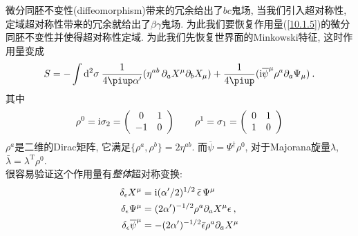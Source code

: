 微分同胚不变性(diffeomorphism)带来的冗余给出了$bc$鬼场, 当我们引入超对称性, 定域超对称性带来的冗余就给出了$\beta\gamma$鬼场. 为此我们要恢复作用量(\ref{10.1.5})的微分同胚不变性并使得超对称性定域.
为此我们先恢复世界面的Minkowski特征, 这时作用量变成
\begin{equation*}
    S=-\int\dif^{2}\sigma\:\frac{1}{4\uppi\alpha^{\prime}}(
    \eta^{ab}\,\partial_{a}X^{\mu}\partial_{b}X_{\mu})
    +\frac{1}{4\uppi}(\mi\overline{\psi}^{\mu}\rho^{a}\partial_{a}\Psi_{\mu})\:.
\end{equation*}
其中
\begin{equation*}
    \rho^{0}=\mathrm{i}\sigma_{2}=
    \left(\begin{array}{cc}
         0&1  \\
         -1&0 
    \end{array}\right) \qquad
    \rho^{1}=\sigma_{1}=
    \left(\begin{array}{cc}
         0&1  \\
         1&0 
    \end{array}\right)
\end{equation*}
$\rho^{a}$是二维的Dirac矩阵, 它满足$\{\rho^{a},\rho^{b}\}=2\eta^{ab}$. 而$\overline{\psi}=\Psi^{\dag}\rho^{0}$, 对于Majorana旋量$\lambda$, $\bar{\lambda}=\lambda^{\mathrm{T}}\rho^{0}$.
\\
很容易验证这个作用量有{\emph{整体}}超对称变换:
\begin{align*}
    \delta_{\epsilon}X^{\mu}&=\mathrm{i}(\alpha^{\prime}/2)^{1/2}\,\bar{\epsilon}\,\Psi^{\mu} \\
    \delta_{\epsilon}\Psi^{\mu}&=(2\alpha^{\prime})^{-1/2}\rho^{a}\partial_{a}X^{\mu}\epsilon\:, \\
    \delta _{\epsilon }\overline{\psi}^{\mu }&=-(2\alpha ^{\prime })^{-1/2}\bar{\epsilon}\rho ^{a}\partial _{a}X^{\mu }
\end{align*}

